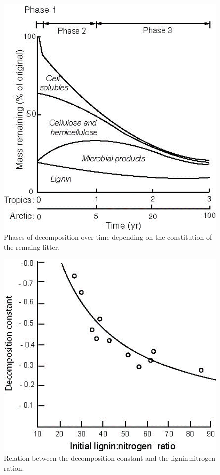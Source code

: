 \documentclass[12pt,oneside]{book}
\begin{document}
\begin{figure}

{\centering \includegraphics[width=0.8\linewidth]{figures/chap5/f515_decomp_phases} 

}

\caption{Phases of decomposition over time depending on the constitution of the remaing litter.}\label{fig:f515}
\end{figure}

\begin{figure}

{\centering \includegraphics[width=0.8\linewidth]{figures/chap5/f516_decay_lignin} 

}

\caption{Relation between the decomposition constant and the lignin:nitrogen ration.}\label{fig:f516}
\end{figure}
\end{document}
